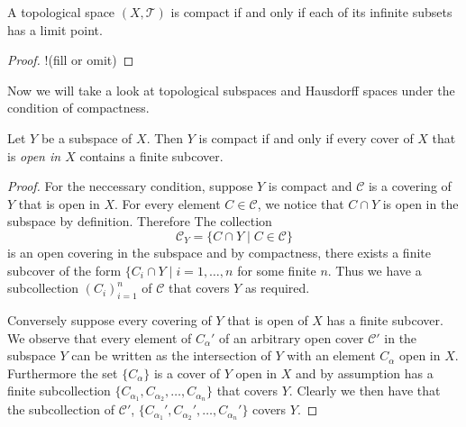 \begin{thm}
  A topological space $(X, \mathscr{T})$ is compact if and only if
  each of its infinite subsets has a limit point.
\end{thm}

\begin{proof}
  !(fill or omit)
\end{proof}

Now we will take a look at topological subspaces and Hausdorff spaces
under the condition of compactness.

\begin{lem}
  Let $Y$ be a subspace of $X$. Then $Y$ is compact if and only if
  every cover of $X$ that is \emph{open in $X$} contains a finite
  subcover.
\end{lem}

\begin{proof}
  For the neccessary condition, suppose $Y$ is compact and
  $\mathscr{C}$ is a covering of $Y$ that is open in $X$. For every
  element $C \in \mathscr{C}$, we notice that $C \cap Y$ is open in
  the subspace by definition. Therefore The collection
  \[
    \mathscr{C}_Y = \{ C \cap Y \mid C \in \mathscr{C} \}
  \]
  is an open covering in the subspace and by compactness, there exists
  a finite subcover of the form $\{C_i \cap Y \mid i = 1, \dots,
  n$ for some finite $n$. Thus we have a subcollection $(C_i)_{i=1}^n$
  of $\mathscr{C}$ that covers $Y$ as required.

  Conversely suppose every covering of $Y$ that is open of $X$ has a
  finite subcover. We observe that every element of $C_\alpha'$ of an
  arbitrary open cover $\mathscr{C}'$ in the subspace $Y$ can be
  written as the intersection of $Y$ with an element $C_\alpha$ open
  in $X$. Furthermore the set $\{C_\alpha \}$ is a cover of $Y$ open
  in $X$ and by assumption has a finite subcollection $\{C_{\alpha_1},
  C_{\alpha_2}, \dots, C_{\alpha_n} \}$ that covers $Y$. Clearly we
  then have that the subcollection of $\mathscr{C}'$,
  $\{C_{\alpha_1}', C_{\alpha_2}', \dots, C_{\alpha_n}' \}$ covers
  $Y$. 
\end{proof}


